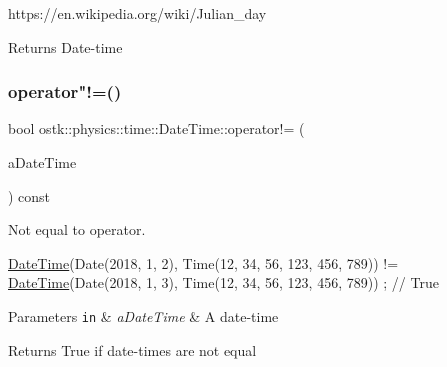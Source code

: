 https\+://en.wikipedia.\+org/wiki/\+Julian\+\_\+day

\begin{DoxyReturn}{Returns}
Date-\/time 
\end{DoxyReturn}
\mbox{\label{classostk_1_1physics_1_1time_1_1_date_time_ae96358ed48be6bb4325d3f3408a8ab5c}} 
\subsubsection{\texorpdfstring{operator"!=()}{operator!=()}}
{\footnotesize\ttfamily bool ostk\+::physics\+::time\+::\+Date\+Time\+::operator!= (\begin{DoxyParamCaption}\item[{const \hyperlink{classostk_1_1physics_1_1time_1_1_date_time}{Date\+Time} \&}]{a\+Date\+Time }\end{DoxyParamCaption}) const}



Not equal to operator. 


\begin{DoxyCode}
\hyperlink{classostk_1_1physics_1_1time_1_1_date_time_a974b5a7581ae7461ccf0e6ab85e42633}{DateTime}(Date(2018, 1, 2), Time(12, 34, 56, 123, 456, 789)) != \hyperlink{classostk_1_1physics_1_1time_1_1_date_time_a974b5a7581ae7461ccf0e6ab85e42633}{DateTime}(Date(2018, 1, 3), 
      Time(12, 34, 56, 123, 456, 789)) ; \textcolor{comment}{// True}
\end{DoxyCode}



\begin{DoxyParams}[1]{Parameters}
\mbox{\tt in}  & {\em a\+Date\+Time} & A date-\/time \\
\hline
\end{DoxyParams}
\begin{DoxyReturn}{Returns}
True if date-\/times are not equal 
\end{DoxyReturn}
\mbox{\label{classostk_1_1physics_1_1time_1_1_date_time_a8ffda673aa698ebe33cd4c4d4a041ef6}} 
